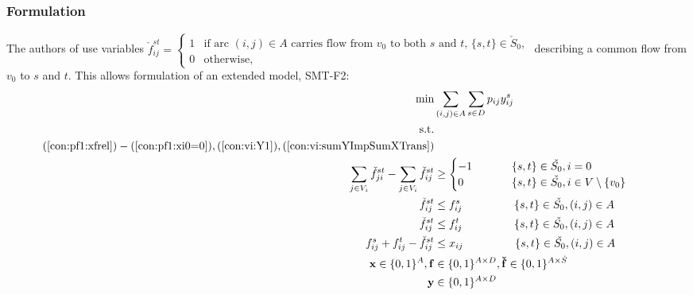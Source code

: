 \subsubsection{Formulation}
The authors of \cite{Polzin} use variables
\newline\newline  
  $\check{f}^{st}_{ij}=
	\begin{cases}
    1 & \text{if arc $(i,j) \in A$ carries flow from $v_0$ to both $s$ and $t$, $\{s,t\}\in \check{S}_0$},\\
    0 & \text{otherwise},
  \end{cases}$
  \newline\newline  
  describing a common flow from $v_0$ to $s$ and $t$. This allows formulation of an extended model, SMT-F2: 
    \begin{subequations}
    \begin{flalign}
  \min &  \sum\limits_{(i,j) \in A} \sum\limits_{s \in D} p_{ij} y^s_{ij}    \\  \notag  
		   \text{s.t.}&                  && \\			   
		   (\ref{con:pf1:xfrel}) - (\ref{con:pf1:xi0=0}), (\ref{con:vi:Y1}),(\ref{con:vi:sumYImpSumXTrans}) \notag \\ 	
\label{con:pf2:flowHook}  \sum\limits_{\substack{ j \in V_i }}\check{f}^{st}_{ji}-\sum\limits_{\substack{j\in V_i}}\check{f}^{st}_{ij}    & \geq \begin{cases}
    -1~~~&  \{s,t\}\in \check{S_0}, i = 0 \\        0  ~~~~   \qquad         & \{s,t\}\in \check{S_0}, i\in V\setminus \{v_0\}\end{cases}     \\			
\label{con:pf2:startInSource}  \check{f}^{st}_{ij}    & \leq f^s_{ij}~~   \qquad  \qquad \{s,t\}\in \check{S_0}, (i,j)\in A \\	
\label{con:pf2:stopInDest}  \check{f}^{st}_{ij}    & \leq f^t_{ij}~~   \qquad    \qquad \{s,t\}\in \check{S_0}, (i,j)\in A \\			 		
 \label{con:pf2:stronger}  f^{s}_{ij}+f^{t}_{ij}-\check{f}^{st}_{ij}    &\leq x_{ij}    ~~ \qquad \qquad  \{s,t\}\in \check{S_0}, (i,j)\in A \\			 	   			  
 \label{con:pf2:dim}  \mathbf{x}     \in \{0,1\}^A,  \mathbf{f}&\in \{0,1\}^{A\times D}, \mathbf{\check{f}}\in\{0,1\}^{A\times \check{S}}\\
 \label{con:pf2:dim2}  \mathbf{y} & \in \{0,1\}^{A\times D}
    \end{flalign}~
    \end{subequations}

